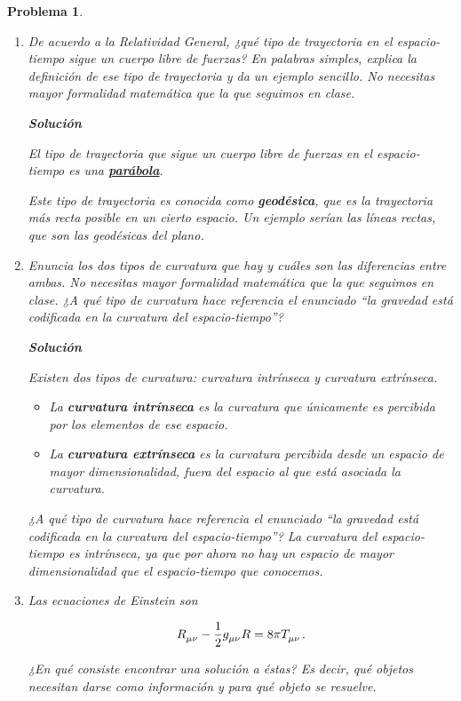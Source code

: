 \documentclass[12pt]{article}
\theoremstyle{break}
\newtheorem{exercise}{Problema}
\theoremstyle{nonumberbreak}
\newcommand*{\inlinesol}{\vspace*{10pt}\textbf{Solución}\vspace*{10pt}}
\begin{document}
    \pagebreak
    \begin{exercise}
        \begin{enumerate}[label = \alph*)]
            \item De acuerdo a la Relatividad General, ¿qué tipo de trayectoria en el espacio-tiempo sigue un cuerpo libre de fuerzas? En palabras simples, explica la definición de ese tipo de trayectoria y da un ejemplo sencillo. No necesitas mayor formalidad matemática que la que seguimos en clase.
            
            \inlinesol

            El tipo de trayectoria que sigue un cuerpo libre de fuerzas en el espacio-tiempo es una \ul{\textbf{parábola}}.\par

            Este tipo de trayectoria es conocida como \textbf{geodésica}, que es la trayectoria más recta posible en un cierto espacio. Un ejemplo serían las líneas rectas, que son las geodésicas del plano.

            \item Enuncia los dos tipos de curvatura que hay y cuáles son las diferencias entre ambas. No necesitas mayor formalidad matemática que la que seguimos en clase. ¿A qué tipo de curvatura hace referencia el enunciado ``la gravedad está codificada en la curvatura del espacio-tiempo''?
            
            \inlinesol

            Existen dos tipos de curvatura: curvatura intrínseca y curvatura extrínseca.

            \begin{itemize}[label = \textbullet]
                \item La \textbf{curvatura intrínseca} es la curvatura que únicamente es percibida por los \emph{elementos} de ese espacio. 
                \item La \textbf{curvatura extrínseca} es la curvatura percibida desde un espacio de mayor dimensionalidad, fuera del espacio al que está asociada la curvatura.
            \end{itemize}

            ¿A qué tipo de curvatura hace referencia el enunciado ``la gravedad está codificada en la curvatura del espacio-tiempo''? La curvatura del espacio-tiempo es intrínseca, ya que por ahora no hay un espacio de mayor dimensionalidad que el espacio-tiempo que conocemos.

            \item Las ecuaciones de Einstein son
            
            \begin{equation}
                \tensor{R}{_{\mu\nu}} - \dfrac{1}{2}\tensor{g}{_{\mu\nu}}R = 8\pi\tensor{T}{_{\mu\nu}}. 
                \label{eq:EinsteinEqs}
            \end{equation}

            ¿En qué consiste encontrar una solución a éstas? Es decir, qué objetos necesitan darse como información y para qué objeto se resuelve.
        \end{enumerate}
    \end{exercise}
\end{document}
